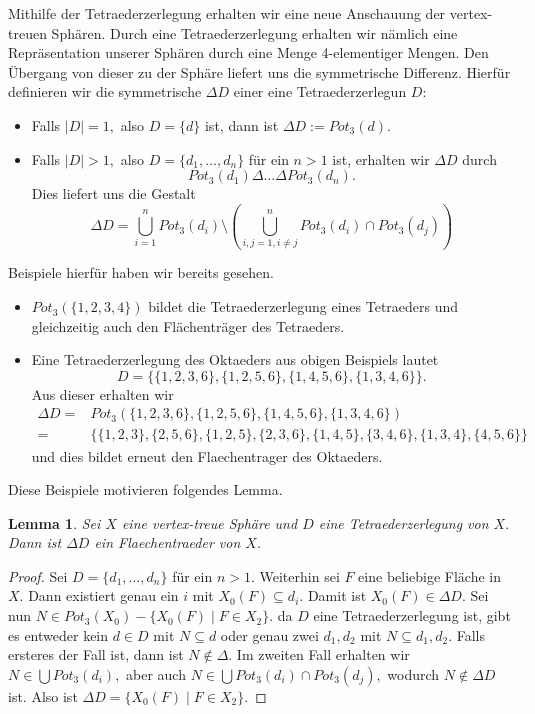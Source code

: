 \documentclass[12pt,titlepage,twoside,cleardoublepage]{article}
\theoremstyle{nummermitklammern}
\newtheorem{lemma}[temp]{Lemma}
\newtheorem{lemma}[zahl]{Lemma}
\numberwithin{equation}{section}
\begin{document}
Mithilfe der Tetraederzerlegung erhalten wir eine neue Anschauung der vertex-treuen Sphären. Durch eine Tetraederzerlegung erhalten wir nämlich eine Repräsentation unserer Sphären durch eine Menge 4-elementiger Mengen. Den Übergang von dieser zu der Sphäre liefert uns die symmetrische Differenz. Hierfür definieren wir die symmetrische $\Delta D$ einer eine Tetraederzerlegun $D:$
\begin{itemize}
\item Falls $\vert D\vert =1,$ also $D=\{d\}$ ist, dann ist $\Delta D:=Pot_3(d).$
\item Falls $\vert D\vert >1,$ also $D=\{d_1,\ldots,d_n\}$ für ein $n>1$ ist, erhalten wir $\Delta D$ durch
\[
Pot_3(d_1)\Delta \ldots \Delta Pot_3(d_n).
\]
Dies liefert uns die Gestalt 
\[
\Delta D=\bigcup^n_{i=1} Pot_3(d_i)\setminus  (\bigcup^n_{i,j=1,i\neq j}Pot_3(d_i)\cap Pot_3(d_j))
\]
\end{itemize} 
Beispiele hierfür haben wir bereits gesehen.
\begin{itemize}
\item $Pot_3(\{1,2,3,4\})$ bildet die Tetraederzerlegung eines Tetraeders und gleichzeitig auch den Flächenträger des Tetraeders.
\item Eine Tetraederzerlegung des Oktaeders aus obigen Beispiels lautet
 \[
D=\{\{1,2,3,6\},\{1,2,5,6\},\{1,4,5,6\},\{1,3,4,6\}\}. 
 \]
 Aus dieser erhalten wir 
 \begin{align*}
\Delta D=&Pot_3(\{1,2,3,6\},\{1,2,5,6\},\{1,4,5,6\},\{1,3,4,6\})\\
=&\{\{1,2,3\},\{2,5,6\},\{1,2,5\},\{2,3,6\},\{1,4,5\},\{3,4,6\},\{1,3,4\},\{4,5,6\}\}
\end{align*}
und dies bildet erneut den Flaechentrager des Oktaeders.
\end{itemize} 
Diese Beispiele motivieren folgendes Lemma.
\begin{lemma}
Sei $X$ eine vertex-treue Sphäre und $D$ eine Tetraederzerlegung von $X.$ Dann ist $\Delta D$ ein Flaechentraeder von $X.$
\end{lemma}
\begin{proof}
Sei $D=\{d_1,\ldots,d_n\}$ für ein $n>1.$
Weiterhin sei $F$ eine beliebige Fläche in $X.$ Dann existiert genau ein $i$ mit $X_0(F)\subseteq d_i.$ Damit ist $X_0(F) \in \Delta D.$ Sei nun $N\in Pot_3(X_0)-\{X_0(F)\mid F\in X_2\}.$ da $D$ eine Tetraederzerlegung ist, gibt es entweder kein $d\in D$ mit $N\subseteq d$ oder genau zwei $d_1,d_2$ mit $N\subseteq d_1,d_2.$ Falls ersteres der Fall ist, dann ist $N\notin \Delta.$ Im zweiten Fall erhalten wir $N\in \bigcup Pot_3(d_i),$ aber auch $N\in \bigcup Pot_3(d_i)\cap Pot_3(d_j),$ wodurch $N\notin \Delta D$ ist. 
Also ist $\Delta D=\{X_0(F)\mid F\in X_2\}.$ 
\end{proof}
\end{document}
